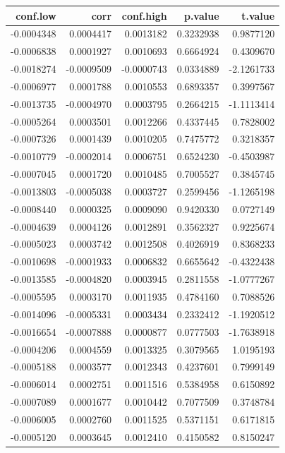 \documentclass[]{tufte-handout}
\begin{document}
\begin{longtable}[]{@{}rrrrr@{}}
\toprule
conf.low & corr & conf.high & p.value & t.value \\
\midrule
\endhead
-0.0004348 & 0.0004417 & 0.0013182 & 0.3232938 & 0.9877120 \\
-0.0006838 & 0.0001927 & 0.0010693 & 0.6664924 & 0.4309670 \\
-0.0018274 & -0.0009509 & -0.0000743 & 0.0334889 & -2.1261733 \\
-0.0006977 & 0.0001788 & 0.0010553 & 0.6893357 & 0.3997567 \\
-0.0013735 & -0.0004970 & 0.0003795 & 0.2664215 & -1.1113414 \\
-0.0005264 & 0.0003501 & 0.0012266 & 0.4337445 & 0.7828002 \\
-0.0007326 & 0.0001439 & 0.0010205 & 0.7475772 & 0.3218357 \\
-0.0010779 & -0.0002014 & 0.0006751 & 0.6524230 & -0.4503987 \\
-0.0007045 & 0.0001720 & 0.0010485 & 0.7005527 & 0.3845745 \\
-0.0013803 & -0.0005038 & 0.0003727 & 0.2599456 & -1.1265198 \\
-0.0008440 & 0.0000325 & 0.0009090 & 0.9420330 & 0.0727149 \\
-0.0004639 & 0.0004126 & 0.0012891 & 0.3562327 & 0.9225674 \\
-0.0005023 & 0.0003742 & 0.0012508 & 0.4026919 & 0.8368233 \\
-0.0010698 & -0.0001933 & 0.0006832 & 0.6655642 & -0.4322438 \\
-0.0013585 & -0.0004820 & 0.0003945 & 0.2811558 & -1.0777267 \\
-0.0005595 & 0.0003170 & 0.0011935 & 0.4784160 & 0.7088526 \\
-0.0014096 & -0.0005331 & 0.0003434 & 0.2332412 & -1.1920512 \\
-0.0016654 & -0.0007888 & 0.0000877 & 0.0777503 & -1.7638918 \\
-0.0004206 & 0.0004559 & 0.0013325 & 0.3079565 & 1.0195193 \\
-0.0005188 & 0.0003577 & 0.0012343 & 0.4237601 & 0.7999149 \\
-0.0006014 & 0.0002751 & 0.0011516 & 0.5384958 & 0.6150892 \\
-0.0007089 & 0.0001677 & 0.0010442 & 0.7077509 & 0.3748784 \\
-0.0006005 & 0.0002760 & 0.0011525 & 0.5371151 & 0.6171815 \\
-0.0005120 & 0.0003645 & 0.0012410 & 0.4150582 & 0.8150247 \\

\end{longtable}
\end{document}
